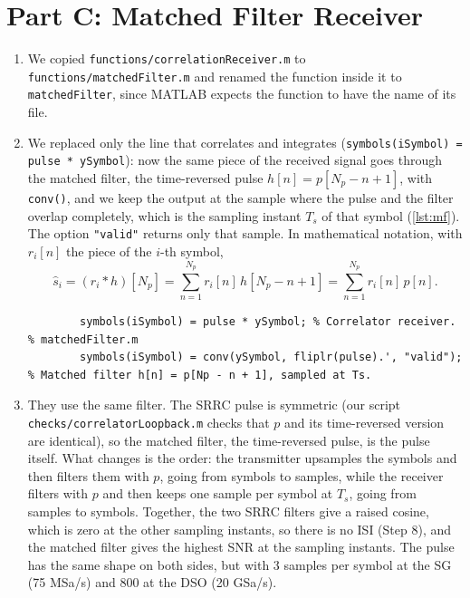 \documentclass[11pt]{article}
\begin{document}
\section*{Part C: Matched Filter Receiver}
\begin{enumerate}[resume]
    \item We copied \texttt{functions/correlationReceiver.m} to \texttt{functions/matchedFilter.m} and renamed the function inside it to \texttt{matchedFilter}, since MATLAB expects the function to have the name of its file.

    \item We replaced only the line that correlates and integrates (\texttt{symbols(iSymbol) = pulse * ySymbol}): now the same piece of the received signal goes through the matched filter, the time-reversed pulse $h[n] = p[N_p - n + 1]$, with \texttt{conv()}, and we keep the output at the sample where the pulse and the filter overlap completely, which is the sampling instant $T_s$ of that symbol (\cref{lst:mf}). The option \texttt{"valid"} returns only that sample. In mathematical notation, with $r_i[n]$ the piece of the $i$-th symbol,
    \begin{equation}
        \hat{s}_i = (r_i * h)[N_p] = \sum_{n=1}^{N_p} r_i[n]\, h[N_p - n + 1] = \sum_{n=1}^{N_p} r_i[n]\, p[n].
    \end{equation}
\begin{lstlisting}[caption={Our change to \texttt{matchedFilter.m}, the only line that differs from \texttt{correlationReceiver.m} apart from the function name.}, label={lst:mf}]
% correlationReceiver.m
        symbols(iSymbol) = pulse * ySymbol; % Correlator receiver.
% matchedFilter.m
        symbols(iSymbol) = conv(ySymbol, fliplr(pulse).', "valid"); % Matched filter h[n] = p[Np - n + 1], sampled at Ts.
\end{lstlisting}

    \item They use the same filter. The SRRC pulse is symmetric (our script \texttt{checks/correlatorLoopback.m} checks that $p$ and its time-reversed version are identical), so the matched filter, the time-reversed pulse, is the pulse itself. What changes is the order: the transmitter upsamples the symbols and then filters them with $p$, going from symbols to samples, while the receiver filters with $p$ and then keeps one sample per symbol at $T_s$, going from samples to symbols. Together, the two SRRC filters give a raised cosine, which is zero at the other sampling instants, so there is no ISI (Step 8), and the matched filter gives the highest SNR at the sampling instants. The pulse has the same shape on both sides, but with 3 samples per symbol at the SG (75 MSa/s) and 800 at the DSO (20 GSa/s).
\end{enumerate}
\end{document}
